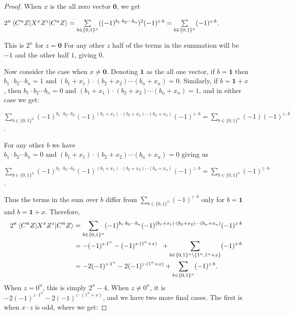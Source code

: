 \documentclass[12pt]{dalthesis}
\begin{document}
\begin{proof}
When $x$ is the all zero vector $\textbf{0}$, we get 
\begin{center}
$2^n\braket{C^n Z|X^xZ^z|C^n Z} = \sum\limits_{b \in \{0, 1\}^n} ((-1)^{b_1 \cdot b_2 \cdots b_n})^2  (-1)^{z \cdot b} = \sum\limits_{b \in \{0, 1\}^n} (-1)^{z \cdot b}$.
\end{center} This is $2^n$ for $z = \textbf{0}$
 For any other $z$ half of the terms in the summation will be $-1$ and the other half $1$, giving $0$. 

Now consider the case when $x \neq \textbf{0}$. Denoting $\textbf{1}$ as the all one vector, if $b = \textbf{1}$ then $b_1 \cdot b_2 \cdots b_n = 1 \mbox{ and } (b_1 + x_1) \cdot (b_2 + x_2) \cdots (b_n + x_n) = 0$. Similarly, if $b = \textbf{1} + x$, then $b_1 \cdot b_2 \cdots b_n = 0 \mbox{ and } (b_1 + x_1) \cdot (b_2 + x_2) \cdots (b_n + x_n) = 1$, and in either case we get: 
\begin{center}
$\sum\limits_{b \in \{0, 1\}^n} (-1)^{b_1 \cdot b_2 \cdots b_n} (-1)^{(b_1 + x_1) \cdot (b_2 + x_2) \cdots (b_n + x_n)} (-1)^{z \cdot b} = \sum\limits_{b \in \{0, 1\}^n} (-1) (-1)^{z \cdot b}$.
\end{center}
For any other $b$ we have $b_1 \cdot b_2 \cdots b_n = 0 \mbox{ and } (b_1 + x_1) \cdot (b_2 + x_2) \cdots (b_n + x_n) = 0$ giving us 
\begin{center}
$\sum\limits_{b \in \{0, 1\}^n} (-1)^{b_1 \cdot b_2 \cdots b_n} (-1)^{(b_1 + x_1) \cdot (b_2 + x_2) \cdots (b_n + x_n)} (-1)^{z \cdot b} = \sum\limits_{b \in \{0, 1\}^n} (-1)^{z \cdot b}$.
\end{center}
Thus the terms in the sum over $b$ differ from $\sum_{b \in \{0, 1\}^n} (-1)^{z \cdot b}$ only for $b = \textbf{1}$ and $b = \textbf{1} + x$. Therefore, 
\begin{equation*}
\begin{split}
2^n\braket{C^n Z|X^xZ^z|C^n Z} & = \sum\limits_{b \in \{0, 1\}^n} (-1)^{b_1 \cdot b_2 \cdots b_n} (-1)^{(b_1 + x_1) \cdot (b_2 + x_2) \cdots (b_n + x_n)} (-1)^{z \cdot b} \\
& = - (-1)^{z \cdot 1^n} - (-1)^{z \cdot (1^n + x)} \hspace{2mm} + \sum\limits_{b \in \{0, 1\}^n \setminus \{1^n, 1^n + x \} } (-1)^{z \cdot b}  \\
& = -2(-1)^{z \cdot 1^n} - 2(-1)^{z \cdot (1^n + x)} + \sum\limits_{b \in \{0, 1\}^n} (-1)^{z \cdot b}.
\end{split}
\end{equation*}
When $z = 0^n$, this is simply $2^n - 4$. When $z \neq 0^n$, it is $-2(-1)^{z \cdot 1^n} - 2(-1)^{z \cdot (1^n + x)}$, and we have two more final cases. The first is when $x \cdot z$ is odd, where we get:

\end{proof}
\end{document}
